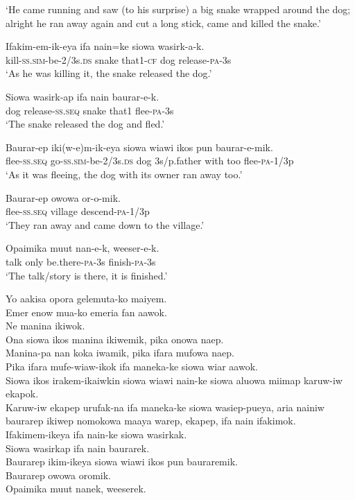 {\glt ‘He came running and saw (to his surprise) a big snake wrapped around the dog; alright he ran away again and cut a long stick, came and killed the snake.’ \\
\z


\ea\label{ex:a:x9}
\gll  Ifakim-em-ik-eya  ifa  nain=ke  siowa  wasirk-a-k. \\
kill-\textsc{ss}.\textsc{sim}-be-2/3s.\textsc{ds}  snake  that1-\textsc{cf}  dog  release-\textsc{pa}-3s \\
\glt ‘As he was killing it, the snake released the dog.’ \\
\z


\ea\label{ex:a:x10}
\gll  Siowa  wasirk-ap  ifa  nain  baurar-e-k. \\
dog  release-\textsc{ss.seq}  snake  that1  flee-\textsc{pa}-3s \\
\glt ‘The snake released the dog and fled.’ \\
\z


\ea\label{ex:a:x11}
\gll  Baurar-ep  iki(w-e)m-ik-eya  siowa  wiawi  ikos  pun  baurar-e-mik. \\
flee-\textsc{ss.seq}  go-\textsc{ss}.\textsc{sim}-be-2/3s.\textsc{ds}  dog  3s/p.father  with  too  flee-\textsc{pa}-1/3p \\
\glt ‘As it was fleeing, the dog with its owner ran away too.’ \\
\z


\ea\label{ex:a:x12}
\gll  Baurar-ep  owowa  or-o-mik. \\
flee-\textsc{ss.seq}  village  descend-\textsc{pa}-1/3p \\
\glt ‘They ran away and came down to the village.’ \\
\z


\ea\label{ex:a:x13}
\gll  Opaimika  muut  nan-e-k,  weeser-e-k. \\
talk  only  be.there-\textsc{pa}-3s  finish-\textsc{pa}-3s \\
\glt ‘The talk/story is there, it is finished.’ \\
\z


Yo aakisa opora gelemuta-ko maiyem. \\
Emer enow mua-ko emeria fan aawok. \\
Ne manina ikiwok. \\
Ona siowa ikos manina ikiwemik, pika onowa naep. \\
Manina-pa nan koka iwamik, pika ifara mufowa naep. \\
Pika ifara mufe-wiaw-ikok ifa maneka-ke siowa wiar aawok. \\
Siowa ikos irakem-ikaiwkin siowa wiawi nain-ke siowa aluowa miimap karuw-iw ekapok. \\
Karuw-iw ekapep urufak-na ifa maneka-ke siowa wasiep-pueya,  aria nainiw baurarep ikiwep nomokowa maaya warep, ekapep, ifa nain ifakimok. \\
Ifakimem-ikeya ifa nain-ke siowa wasirkak. \\
Siowa wasirkap ifa nain baurarek. \\
Baurarep ikim-ikeya siowa wiawi ikos pun bauraremik. \\
Baurarep owowa oromik. \\
Opaimika muut nanek, weeserek. \\

}
